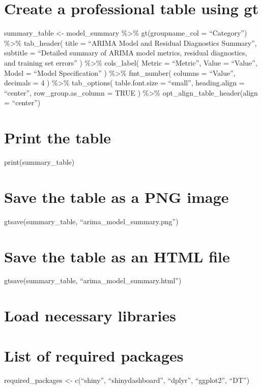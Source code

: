 \documentclass[
]{article}
\begin{document}
\section{Create a professional table using
gt}\label{create-a-professional-table-using-gt}

summary\_table \textless- model\_summary \%\textgreater\%
gt(groupname\_col = ``Category'') \%\textgreater\% tab\_header( title =
``ARIMA Model and Residual Diagnostics Summary'', subtitle = ``Detailed
summary of ARIMA model metrics, residual diagnostics, and training set
errors'' ) \%\textgreater\% cols\_label( Metric = ``Metric'', Value =
``Value'', Model = ``Model Specification'' ) \%\textgreater\%
fmt\_number( columns = ``Value'', decimals = 4 ) \%\textgreater\%
tab\_options( table.font.size = ``small'', heading.align = ``center'',
row\_group.as\_column = TRUE ) \%\textgreater\%
opt\_align\_table\_header(align = ``center'')

\section{Print the table}\label{print-the-table}

print(summary\_table)

\section{Save the table as a PNG
image}\label{save-the-table-as-a-png-image}

gtsave(summary\_table, ``arima\_model\_summary.png'')

\section{Save the table as an HTML
file}\label{save-the-table-as-an-html-file}

gtsave(summary\_table, ``arima\_model\_summary.html'')

\section{Load necessary libraries}\label{load-necessary-libraries}

\section{List of required packages}\label{list-of-required-packages}

required\_packages \textless- c(``shiny'', ``shinydashboard'',
``dplyr'', ``ggplot2'', ``DT'')
\end{document}
